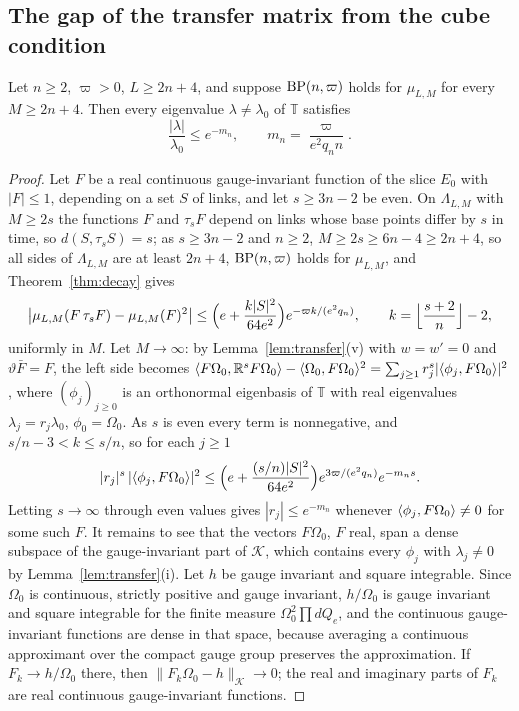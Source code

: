 \subsection{The gap of the transfer matrix from the cube condition}
\label{ssec:cylindergap}

\begin{proposition}\label{prop:cylindergap}
Let $n\ge2$, $\varpi>0$, $L\ge2n+4$, and suppose $\mathrm{BP}(n,\varpi)$ holds for
$\mu_{L,M}$ for every $M\ge2n+4$. Then every eigenvalue $\lambda\ne\lambda_0$ of
$\mathbb T$ satisfies
\[
\frac{|\lambda|}{\lambda_0}\le e^{-m_n},\qquad m_n=\frac{\varpi}{e^2q_nn}.
\]
\end{proposition}

\begin{proof}
Let $F$ be a real continuous gauge-invariant function of the slice $E_0$
with $|F|\le1$, depending on a set $S$ of links, and let $s\ge3n-2$ be
even. On $\Lambda_{L,M}$ with $M\ge2s$ the functions $F$ and $\tau_sF$ depend
on links whose base points differ by $s$ in time, so $d(S,\tau_sS)=s$; as
$s\ge3n-2$ and $n\ge2$, $M\ge2s\ge6n-4\ge2n+4$, so all sides of
$\Lambda_{L,M}$ are at least $2n+4$, $\mathrm{BP}(n,\varpi)$ holds for $\mu_{L,M}$,
and Theorem~\ref{thm:decay} gives
\[
\bigl|\mu_{L,M}(F\,\tau_sF)-\mu_{L,M}(F)^2\bigr|\le
\Bigl(e+\frac{k|S|^2}{64e^2}\Bigr)e^{-\varpi k/(e^2q_n)},\qquad
k=\Bigl\lfloor\frac{s+2}n\Bigr\rfloor-2 ,
\]
uniformly in $M$. Let $M\to\infty$: by Lemma~\ref{lem:transfer}(v) with
$w=w'=0$ and $\vartheta\bar F=F$, the left side becomes
$\langle F\Omega_0,\mathbb R^sF\Omega_0\rangle-\langle \Omega_0,F\Omega_0\rangle^2=
\sum_{j\ge1}r_j^s|\langle \phi_j,F\Omega_0\rangle|^2$, where $(\phi_j)_{j\ge0}$ is an
orthonormal eigenbasis of $\mathbb T$ with real eigenvalues $\lambda_j=r_j
\lambda_0$, $\phi_0=\Omega_0$. As $s$ is even every term is nonnegative, and
$s/n-3<k\le s/n$, so for each $j\ge1$
\[
|r_j|^s\,|\langle \phi_j,F\Omega_0\rangle|^2\le\Bigl(e+\frac{(s/n)|S|^2}{64e^2}\Bigr)
e^{3\varpi/(e^2q_n)}e^{-m_ns}.
\]
Letting $s\to\infty$ through even values gives $|r_j|\le e^{-m_n}$ whenever
$\langle \phi_j,F\Omega_0\rangle\ne0$ for some such $F$. It remains to see that the
vectors $F\Omega_0$, $F$ real, span a dense subspace of the gauge-invariant
part of $\mathcal K$, which contains every $\phi_j$ with $\lambda_j\ne0$ by
Lemma~\ref{lem:transfer}(i). Let $h$ be gauge invariant and square
integrable. Since $\Omega_0$ is continuous, strictly positive and gauge
invariant, $h/\Omega_0$ is gauge invariant and square integrable for the
finite measure $\Omega_0^2\prod dQ_e$, and the continuous gauge-invariant
functions are dense in that space, because averaging a continuous
approximant over the compact gauge group preserves the approximation. If
$F_k\to h/\Omega_0$ there, then $\|F_k\Omega_0-h\|_{\mathcal K}\to0$; the real
and imaginary parts of $F_k$ are real continuous gauge-invariant functions.
\end{proof}

